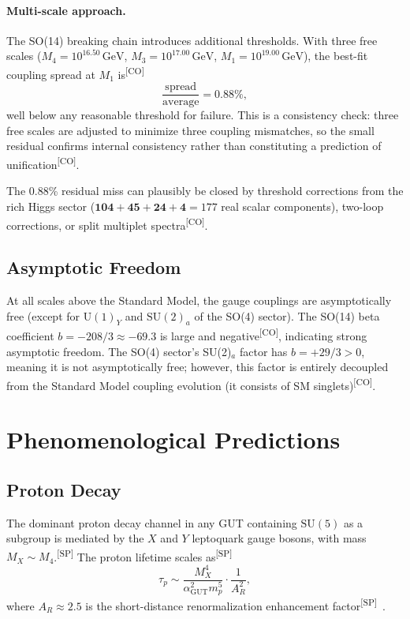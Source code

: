 \documentclass[aps,prd,twocolumn,showpacs,preprintnumbers,superscriptaddress,floatfix]{revtex4-2}
\newcommand{\GeV}{\,\mathrm{GeV}}
\newcommand{\CO}{\textsuperscript{[CO]}}
\newcommand{\SP}{\textsuperscript{[SP]}}
\begin{document}
\paragraph{Multi-scale approach.}
The SO(14) breaking chain introduces additional thresholds.  With
three free scales ($M_4 = 10^{16.50}\GeV$, $M_3 = 10^{17.00}\GeV$,
$M_1 = 10^{19.00}\GeV$), the best-fit coupling spread at $M_1$ is\CO
\begin{equation}\label{eq:multiscale}
  \frac{\text{spread}}{\text{average}} = 0.88\%,
\end{equation}
well below any reasonable threshold for failure.
This is a consistency check: three free scales are adjusted to minimize
three coupling mismatches, so the small residual confirms internal
consistency rather than constituting a prediction of unification\CO.

The 0.88\% residual miss can plausibly be closed by threshold
corrections from the rich Higgs sector ($\mathbf{104} + \mathbf{45}
+ \mathbf{24} + \mathbf{4} = 177$ real scalar components),
two-loop corrections, or split multiplet spectra\CO.

\subsection{Asymptotic Freedom}

At all scales above the Standard Model, the gauge couplings are
asymptotically free (except for $\mathrm{U}(1)_Y$ and
$\mathrm{SU}(2)_a$ of the SO(4) sector).  The SO(14) beta coefficient
$b = -208/3 \approx -69.3$ is large and negative\CO, indicating
strong asymptotic freedom.  The SO(4) sector's SU(2)$_a$ factor has
$b = +29/3 > 0$, meaning it is not asymptotically free; however,
this factor is entirely decoupled from the Standard Model coupling
evolution (it consists of SM singlets)\CO.

\section{Phenomenological Predictions}
\label{sec:pheno}

\subsection{Proton Decay}

The dominant proton decay channel in any GUT containing $\mathrm{SU}(5)$
as a subgroup is mediated by the $X$ and $Y$ leptoquark gauge bosons,
with mass $M_X \sim M_4$.\SP{}  The proton lifetime
scales as\SP
\begin{equation}\label{eq:proton}
  \tau_p \sim \frac{M_X^4}{\alpha_\text{GUT}^2 m_p^5}
    \cdot \frac{1}{A_R^2},
\end{equation}
where $A_R \approx 2.5$ is the short-distance renormalization
enhancement factor\SP\ \cite{nath2007}.
\end{document}

